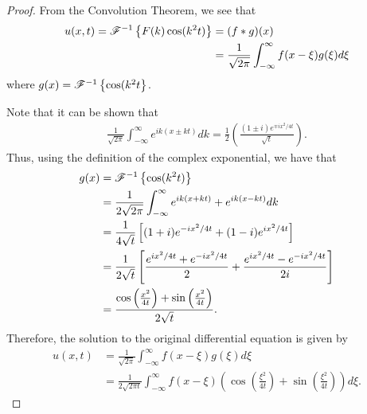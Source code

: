 \begin{proof}
  From the Convolution Theorem, we see that
  \begin{align*}
    u(x,t) = \mathscr{F}^{-1}\left\{ {F(k)\cos(k^2 t)} \right\} &= (f \ast g)(x) \\
    &= \frac{1}{\sqrt{2\pi}} \int_{-\infty}^{\infty}f(x-\xi)g(\xi)d\xi
  \end{align*}
  where $g(x) = \mathscr{F}^{-1}\left\{ {\cos(k^2 t} \right\}$.

  Note that it can be shown that
  \begin{align*}
    \frac{1}{\sqrt{2\pi}}\int_{-\infty}^{\infty} e^{ik(x \pm kt)}dk = \frac{1}{2}\left(\frac{(1\pm i)e^{\mp i x^2 / 4t}}{\sqrt{t}}\right).
  \end{align*}
  Thus, using the definition of the complex exponential, we have that
  \begin{align*}
    g(x) &= \mathscr{F}^{-1}\left\{ {\cos(k^2 t)} \right\} \\
    &= \frac{1}{2\sqrt{2\pi}}\int_{-\infty}^\infty e^{ik(x + kt)} + e^{ik(x - kt)}dk \\
    &= \frac{1}{4\sqrt{t}}\left[(1+i)e^{-ix^2/4t} + (1-i)e^{ix^2/4t}\right] \\
    &= \frac{1}{2\sqrt{t}}\left[\frac{e^{ix^2/4t} + e^{-ix^2/4t}}{2} + \frac{e^{ix^2/4t} - e^{-ix^2/4t}}{2i}\right] \\
    &= \frac{\cos\left(\frac{x^2}{4t}\right) + \sin\left(\frac{x^2}{4t}\right)}{2\sqrt{t}}.
  \end{align*}
  Therefore, the solution to the original differential equation is given by
  \begin{align*}
    u(x,t)
    &= \frac{1}{\sqrt{2\pi}} \int_{-\infty}^{\infty}f(x-\xi)g(\xi)d\xi \\
    &= \frac{1}{2\sqrt{2\pi t}} \int_{-\infty}^{\infty} f(x-\xi)\left(\cos\left(\frac{\xi^2}{4t}\right) + \sin\left(\frac{\xi^2}{4t}\right)\right) d\xi.
  \end{align*}

\end{proof}
\newpage
